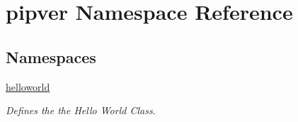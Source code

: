 \hypertarget{namespacepipver}{}\section{pipver Namespace Reference}
\label{namespacepipver}
\subsection*{Namespaces}
\begin{DoxyCompactItemize}
\item 
 \hyperlink{namespacepipver_1_1helloworld}{helloworld}
\begin{DoxyCompactList}\small\item\em Defines the the Hello World Class. \end{DoxyCompactList}\end{DoxyCompactItemize}
